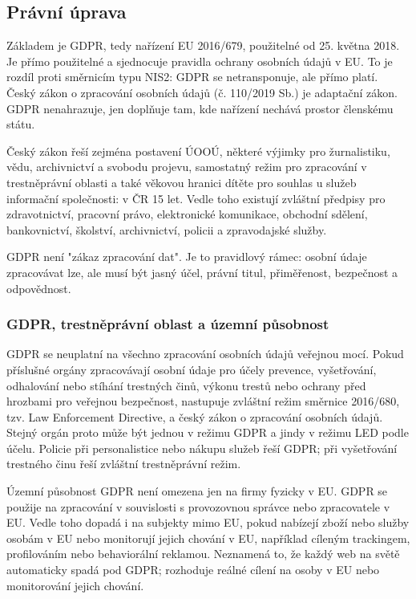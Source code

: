 \documentclass[11pt,a4paper]{article}
\begin{document}
\subsection*{Právní úprava}
Základem je GDPR, tedy nařízení EU 2016/679, použitelné od 25. května 2018. Je přímo použitelné a sjednocuje pravidla ochrany osobních údajů v EU. To je rozdíl proti směrnicím typu NIS2: GDPR se netransponuje, ale přímo platí. Český zákon o zpracování osobních údajů (č. 110/2019 Sb.) je adaptační zákon. GDPR nenahrazuje, jen doplňuje tam, kde nařízení nechává prostor členskému státu.

Český zákon řeší zejména postavení ÚOOÚ, některé výjimky pro žurnalistiku, vědu, archivnictví a svobodu projevu, samostatný režim pro zpracování v trestněprávní oblasti a také věkovou hranici dítěte pro souhlas u služeb informační společnosti: v ČR 15 let. Vedle toho existují zvláštní předpisy pro zdravotnictví, pracovní právo, elektronické komunikace, obchodní sdělení, bankovnictví, školství, archivnictví, policii a zpravodajské služby.

GDPR není "zákaz zpracování dat". Je to pravidlový rámec: osobní údaje zpracovávat lze, ale musí být jasný účel, právní titul, přiměřenost, bezpečnost a odpovědnost.

\subsubsection*{GDPR, trestněprávní oblast a územní působnost}
GDPR se neuplatní na všechno zpracování osobních údajů veřejnou mocí. Pokud příslušné orgány zpracovávají osobní údaje pro účely prevence, vyšetřování, odhalování nebo stíhání trestných činů, výkonu trestů nebo ochrany před hrozbami pro veřejnou bezpečnost, nastupuje zvláštní režim směrnice 2016/680, tzv. Law Enforcement Directive, a český zákon o zpracování osobních údajů. Stejný orgán proto může být jednou v režimu GDPR a jindy v režimu LED podle účelu. Policie při personalistice nebo nákupu služeb řeší GDPR; při vyšetřování trestného činu řeší zvláštní trestněprávní režim.

Územní působnost GDPR není omezena jen na firmy fyzicky v EU. GDPR se použije na zpracování v souvislosti s provozovnou správce nebo zpracovatele v EU. Vedle toho dopadá i na subjekty mimo EU, pokud nabízejí zboží nebo služby osobám v EU nebo monitorují jejich chování v EU, například cíleným trackingem, profilováním nebo behaviorální reklamou. Neznamená to, že každý web na světě automaticky spadá pod GDPR; rozhoduje reálné cílení na osoby v EU nebo monitorování jejich chování.
\end{document}
